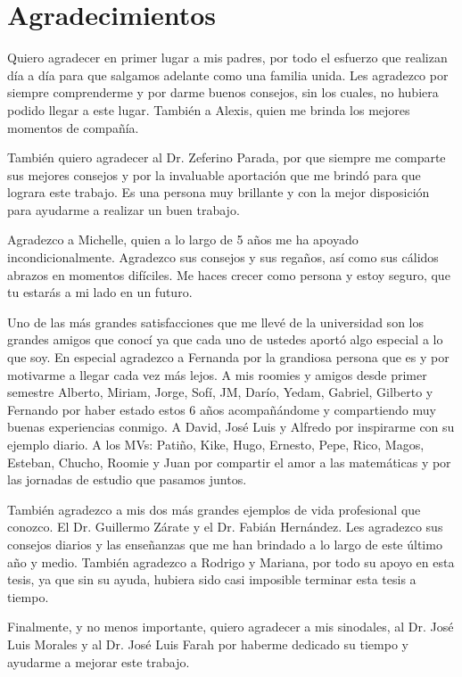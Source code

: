 \chapter*{Agradecimientos}	
\label{ch:agradecimientos}

Quiero agradecer en primer lugar a mis padres, por todo el esfuerzo que realizan día a día para que salgamos adelante como una familia unida. Les agradezco por siempre comprenderme y por darme buenos consejos, sin los cuales, no hubiera podido llegar a este lugar. También a Alexis, quien me brinda los mejores momentos de compañía. 

También quiero agradecer al Dr. Zeferino Parada, por que siempre me comparte sus mejores consejos y por la invaluable aportación que me brindó para que lograra este trabajo. Es una persona muy brillante y con la mejor disposición para ayudarme a realizar un buen trabajo.

Agradezco a Michelle, quien a lo largo de 5 años me ha apoyado incondicionalmente. Agradezco sus consejos y sus regaños, así como sus cálidos abrazos en momentos difíciles. Me haces crecer como persona y estoy seguro, que tu estarás a mi lado en un futuro.

Uno de las más grandes satisfacciones que me llevé de la universidad son los grandes amigos que conocí ya que cada uno de ustedes aportó algo especial a lo que soy. En especial agradezco a Fernanda por la grandiosa persona que es y por motivarme a llegar cada vez más lejos. A mis roomies y amigos desde primer semestre Alberto, Miriam, Jorge, Sofí, JM, Darío, Yedam, Gabriel, Gilberto y Fernando por haber estado estos 6 años acompañándome y compartiendo muy buenas experiencias conmigo. A David, José Luis y Alfredo por inspirarme con su ejemplo diario. A los MVs: Patiño, Kike, Hugo, Ernesto, Pepe, Rico, Magos, Esteban, Chucho, Roomie y Juan por compartir el amor a las matemáticas y por las jornadas de estudio que pasamos juntos. 

También agradezco a mis dos más grandes ejemplos de vida profesional que conozco. El Dr. Guillermo Zárate y el Dr. Fabián Hernández. Les agradezco sus consejos diarios y las enseñanzas que me han brindado a lo largo de este último año y medio. También agradezco a Rodrigo y Mariana, por todo su apoyo en esta tesis, ya que sin su ayuda, hubiera sido casi imposible terminar esta tesis a tiempo.

Finalmente, y no menos importante, quiero agradecer a mis sinodales, al Dr. José Luis Morales y al Dr. José Luis Farah por haberme dedicado su tiempo y ayudarme a mejorar este trabajo.
